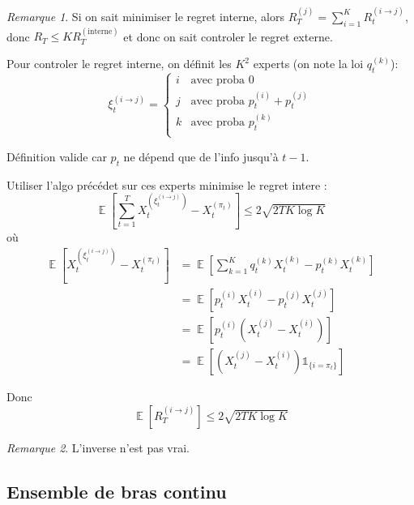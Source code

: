 \documentclass{article}
\DeclareMathOperator*{\E}{\mathbb{E}}
\theoremstyle{remark}
\theoremstyle{remark}
\newtheorem{remark}{Remarque}[section]
\begin{document}
\begin{remark}
   Si on sait minimiser le regret interne, alors $R_T^{(j)} = \sum_{i=1}^K R_t^{(i \rightarrow j)}$, donc $R_T \leq K R_T^{(\text{interne})}$ et donc on sait controler le regret externe.

   Pour controler le regret interne, on définit les $K^2$ experts (on note la loi $q_t^{(k)}$):
   $$
   \xi_t^{(i \rightarrow j)} = \left\{ \begin{array}{ll}
   i & \text{avec proba 0} \\ 
   j & \text{avec proba } p_t^{(i)} + p_t^{(j)} \\
   k & \text{avec proba } p_t^{(k)} \\
   \end{array}\right.
   $$

   Définition valide car $p_t$ ne dépend que de l'info jusqu'à $t-1$.

   Utiliser l'algo précédet sur ces experts minimise le regret intere :
   $$
   \E \left[ \sum_{t=1}^T X_t^{(\xi_t^{(i \rightarrow j)})} - X_t^{(\pi_t)}\right] \leq 2 \sqrt{2 T K \log K}
   $$
   où
   \begin{align*}
      \E \left[ X_t^{(\xi_t^{(i \rightarrow j)})} - X_t^{(\pi_t)}\right]
      &= \E \left[ \sum_{k=1}^K q_t^{(k)} X_t^{(k)} - p_t^{(k)} X_t^{(k)}\right] \\
      &= \E \left[ p_t^{(i)} X_t^{(i)} - p_t^{(j)} X_t^{(j)}\right] \\
      &= \E \left[ p_t^{(i)} (X_t^{(j)} - X_t^{(i)})\right] \\
      &= \E \left[ (X_t^{(j)} - X_t^{(i)}) \mathbb{1}_{\{i = \pi_t \}} \right]
   \end{align*}

   Donc
   $$
   \E[R_T^{(i \rightarrow j)}] \leq 2 \sqrt{2 T K \log K}
   $$
\end{remark}

\begin{remark}
   L'inverse n'est pas vrai.
\end{remark}

\subsection{Ensemble de bras continu}
\end{document}
